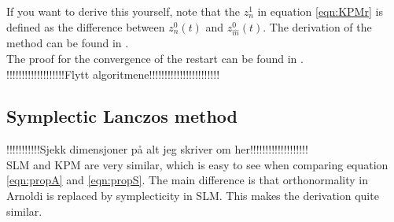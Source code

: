 If you want to derive this yourself, note that the $z_n^1$ in equation \eqref{eqn:KPMr} is defined as the difference between $z_n^0(t)$ and $z_{\hat{m}}^0(t)$. The derivation of the method can be found in \cite{SKRIV NOE HER!!!!!!!}.\\

The proof for the convergence of the restart can be found in \cite{???}.\\
!!!!!!!!!!!!!!!!!!!Flytt algoritmene!!!!!!!!!!!!!!!!!!!!!!!\\
\subsection{Symplectic Lanczos method}
!!!!!!!!!!!Sjekk dimensjoner på alt jeg skriver om her!!!!!!!!!!!!!!!!!!!\\
SLM and KPM are very similar, which is easy to see when comparing equation \eqref{eqn:propA} and \eqref{eqn:propS}. The main difference is that orthonormality in Arnoldi is replaced by symplecticity in SLM. This makes the derivation quite similar.\\

